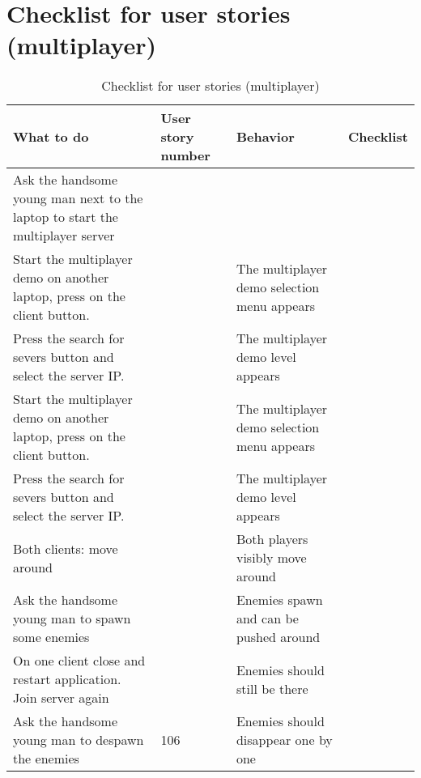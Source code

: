 \documentclass{article}
\begin{document}
\section{Checklist for user stories (multiplayer)}
\begin{table}[H]
    \centering
    \begin{tabular}{|p{3cm}|p{3cm}|p{6cm}|p{3cm}|}
    \hline
    \textbf{What to do} & \textbf{User story number} & \textbf{Behavior} & \textbf{Checklist} \\ \hline
    Ask the handsome young man next to the laptop to start the multiplayer server & & & \\ \hline
    Start the multiplayer demo on another laptop, press on the client button. & & The multiplayer demo selection menu appears & \\ \hline
    Press the search for severs button and select the server IP. & & The multiplayer demo level appears & \\ \hline
    Start the multiplayer demo on another laptop, press on the client button. & & The multiplayer demo selection menu appears & \\ \hline
    Press the search for severs button and select the server IP. & & The multiplayer demo level appears & \\ \hline
    Both clients: move around & & Both players visibly move around & \\ \hline
    Ask the handsome young man to spawn some enemies & & Enemies spawn and can be pushed around & \\ \hline
    On one client close and restart application. Join server again & & Enemies should still be there & \\ \hline
    Ask the handsome young man to despawn the enemies & 106 & Enemies should disappear one by one & \\ \hline

    \end{tabular}
    \caption{Checklist for user stories (multiplayer)}
    \label{tab:user_stories}
    \end{table}
\end{document}
